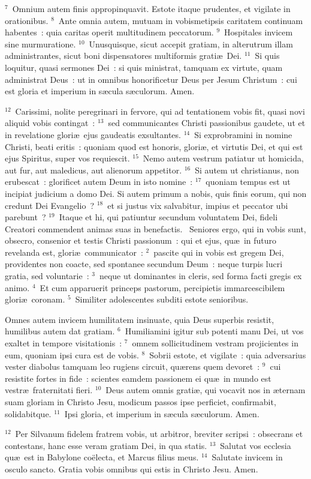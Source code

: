 ${}^{7}$~Omnium autem finis appropinquavit. Estote itaque prudentes, et vigilate in orationibus.
${}^{8}$~Ante omnia autem, mutuam in vobismetipsis caritatem continuam habentes~: quia caritas operit multitudinem peccatorum.
${}^{9}$~Hospitales invicem sine murmuratione.
${}^{10}$~Unusquisque, sicut accepit gratiam, in alterutrum illam administrantes, sicut boni dispensatores multiformis grati\ae\ Dei.
${}^{11}$~Si quis loquitur, quasi sermones Dei~: si quis ministrat, tamquam ex virtute, quam administrat Deus~: ut in omnibus honorificetur Deus per Jesum Christum~: cui est gloria et imperium in s\ae cula s\ae culorum. Amen.


${}^{12}$~Carissimi, nolite peregrinari in fervore, qui ad tentationem vobis fit, quasi novi aliquid vobis contingat~:
${}^{13}$~sed communicantes Christi passionibus gaudete, ut et in revelatione glori\ae\ ejus gaudeatis exsultantes.
${}^{14}$~Si exprobramini in nomine Christi, beati eritis~: quoniam quod est honoris, glori\ae , et virtutis Dei, et qui est ejus Spiritus, super vos requiescit.
${}^{15}$~Nemo autem vestrum patiatur ut homicida, aut fur, aut maledicus, aut alienorum appetitor.
${}^{16}$~Si autem ut christianus, non erubescat~: glorificet autem Deum in isto nomine~:
${}^{17}$~quoniam tempus est ut incipiat judicium a domo Dei. Si autem primum a nobis, quis finis eorum, qui non credunt Dei Evangelio~?
${}^{18}$~et si justus vix salvabitur, impius et peccator ubi parebunt~?
${}^{19}$~Itaque et hi, qui patiuntur secundum voluntatem Dei, fideli Creatori commendent animas suas in benefactis.
~Seniores ergo, qui in vobis sunt, obsecro, consenior et testis Christi passionum~: qui et ejus, qu\ae\ in futuro revelanda est, glori\ae\ communicator~:
${}^{2}$~pascite qui in vobis est gregem Dei, providentes non coacte, sed spontanee secundum Deum~: neque turpis lucri gratia, sed voluntarie~:
${}^{3}$~neque ut dominantes in cleris, sed forma facti gregis ex animo.
${}^{4}$~Et cum apparuerit princeps pastorum, percipietis immarcescibilem glori\ae\ coronam.
${}^{5}$~Similiter adolescentes subditi estote senioribus.

 Omnes autem invicem humilitatem insinuate, quia Deus superbis resistit, humilibus autem dat gratiam.
${}^{6}$~Humiliamini igitur sub potenti manu Dei, ut vos exaltet in tempore visitationis~:
${}^{7}$~omnem sollicitudinem vestram projicientes in eum, quoniam ipsi cura est de vobis.
${}^{8}$~Sobrii estote, et vigilate~: quia adversarius vester diabolus tamquam leo rugiens circuit, qu\ae rens quem devoret~:
${}^{9}$~cui resistite fortes in fide~: scientes eamdem passionem ei qu\ae\ in mundo est vestr\ae\ fraternitati fieri.
${}^{10}$~Deus autem omnis grati\ae , qui vocavit nos in \ae ternam suam gloriam in Christo Jesu, modicum passos ipse perficiet, confirmabit, solidabitque.
${}^{11}$~Ipsi gloria, et imperium in s\ae cula s\ae culorum. Amen.


${}^{12}$~Per Silvanum fidelem fratrem vobis, ut arbitror, breviter scripsi~: obsecrans et contestans, hanc esse veram gratiam Dei, in qua statis.
${}^{13}$~Salutat vos ecclesia qu\ae\ est in Babylone co\"electa, et Marcus filius meus.
${}^{14}$~Salutate invicem in osculo sancto. Gratia vobis omnibus qui estis in Christo Jesu. Amen.

